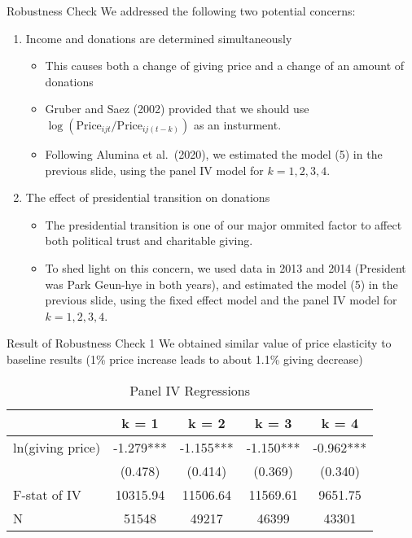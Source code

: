 \documentclass[
  ignorenonframetext,
]{beamer}
\providecommand{\tightlist}{%
  \setlength{\itemsep}{0pt}\setlength{\parskip}{0pt}}
\begin{document}
\begin{frame}{Robustness Check}
\protect\hypertarget{robustness-check}{}
We addressed the following two potential concerns:

\begin{enumerate}
\tightlist
\item
  Income and donations are determined simultaneously

  \begin{itemize}
  \tightlist
  \item
    This causes both a change of giving price and a change of an amount
    of donations
  \item
    Gruber and Saez (2002) provided that we should use
    \(\log(\text{Price}_{ijt}/\text{Price}_{ij(t-k)})\) as an
    insturment.
  \item
    Following Alumina et al.~(2020), we estimated the model (5) in the
    previous slide, using the panel IV model for \(k = 1, 2, 3, 4\).
  \end{itemize}
\item
  The effect of presidential transition on donations

  \begin{itemize}
  \tightlist
  \item
    The presidential transition is one of our major ommited factor to
    affect both political trust and charitable giving.
  \item
    To shed light on this concern, we used data in 2013 and 2014
    (President was Park Geun-hye in both years), and estimated the model
    (5) in the previous slide, using the fixed effect model and the
    panel IV model for \(k = 1, 2, 3, 4\).
  \end{itemize}
\end{enumerate}
\end{frame}

\begin{frame}{Result of Robustness Check 1}
\protect\hypertarget{result-of-robustness-check-1}{}
We obtained similar value of price elasticity to baseline results (1\%
price increase leads to about 1.1\% giving decrease)

\begin{table}

\caption{\label{tab:kableRobust1EstimateElasticity}Panel IV Regressions}
\centering
\begin{tabular}[t]{lcccc}
\toprule
 & k = 1 & k = 2 & k = 3 & k = 4\\
\midrule
ln(giving price) & -1.279*** & -1.155*** & -1.150*** & -0.962***\\
 & (0.478) & (0.414) & (0.369) & (0.340)\\
F-stat of IV & 10315.94 & 11506.64 & 11569.61 & 9651.75\\
N & 51548 & 49217 & 46399 & 43301\\
\bottomrule
\end{tabular}
\end{table}
\end{frame}
\end{document}
